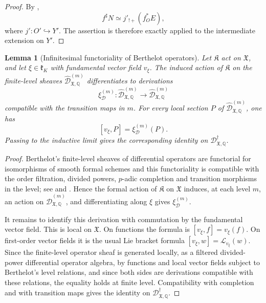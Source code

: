 \documentclass[11pt]{amsart}
\theoremstyle{plain}
\newtheorem{lemma}{Lemma}[section]
\theoremstyle{definition}
\theoremstyle{remark}
\begin{document}
\begin{proof}
By ,
\[
  f^\sharp N\simeq j'_{!+}(f_O^*E),
\]
where \(j':O'\hookrightarrow Y'\). The assertion is therefore exactly
 applied to the
intermediate extension on \(Y'\).
\end{proof}

\begin{lemma}[Infinitesimal functoriality of Berthelot operators]
\label{lem:infinitesimal-functoriality-operators}
Let \(\mathfrak K\) act on \(\mathfrak X\), and let
\(\xi\in\mathfrak k_K\) with fundamental vector field \(v_\xi\). The induced
action of \(\mathfrak K\) on the finite-level sheaves
\(\widehat{\mathscr D}^{(m)}_{\mathfrak X,\mathbb Q}\) differentiates to
derivations
\[
  \xi_{\mathscr D}^{(m)}:
  \widehat{\mathscr D}^{(m)}_{\mathfrak X,\mathbb Q}
  \longrightarrow
  \widehat{\mathscr D}^{(m)}_{\mathfrak X,\mathbb Q}
\]
compatible with the transition maps in \(m\). For every local section
\(P\) of \(\widehat{\mathscr D}^{(m)}_{\mathfrak X,\mathbb Q}\), one has
\[
  [v_\xi,P]=\xi_{\mathscr D}^{(m)}(P).
\]
Passing to the inductive limit gives the corresponding identity on
\(\mathscr D^\dagger_{\mathfrak X,\mathbb Q}\).
\end{lemma}

\begin{proof}
Berthelot's finite-level sheaves of differential operators are functorial for
isomorphisms of smooth formal schemes and this functoriality is compatible with
the order filtration, divided powers, \(p\)-adic completion and transition
morphisms in the level; see \cite[Sections 2.2 and 3]{BerthelotDModules} and
\cite[\S\S5.2--5.3]{BerthelotIntro}. Hence the formal action of
\(\mathfrak K\) on \(\mathfrak X\) induces, at each level \(m\), an action on
\(\widehat{\mathscr D}^{(m)}_{\mathfrak X,\mathbb Q}\), and differentiating
along \(\xi\) gives \(\xi_{\mathscr D}^{(m)}\).

It remains to identify this derivation with commutation by the fundamental
vector field. This is local on \(\mathfrak X\). On functions the formula is
\([v_\xi,f]=v_\xi(f)\). On first-order vector fields it is the usual Lie
bracket formula \([v_\xi,w]=\mathcal L_{v_\xi}(w)\). Since the finite-level
operator sheaf is generated locally, as a filtered divided-power differential
operator algebra, by functions and local vector fields subject to Berthelot's
level relations, and since both sides are derivations compatible with these
relations, the equality holds at finite level. Compatibility with completion
and with transition maps gives the identity on
\(\mathscr D^\dagger_{\mathfrak X,\mathbb Q}\).
\end{proof}
\end{document}
